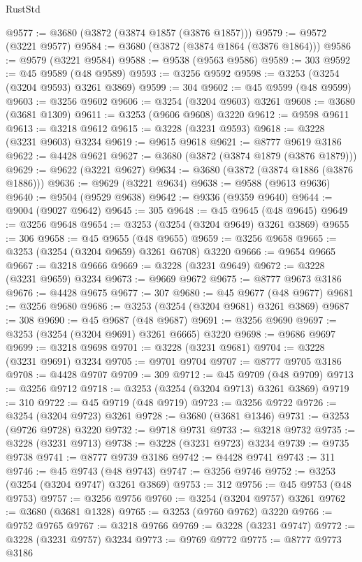 \begin{lexlean}{RustStd}
\begin{coremodule}
@9577 := @3680 (@3872 (@3874 @1857 (@3876 @1857)))
@9579 := @9572 (@3221 @9577)
@9584 := @3680 (@3872 (@3874 @1864 (@3876 @1864)))
@9586 := @9579 (@3221 @9584)
@9588 := @9538 (@9563 @9586)
@9589 := 303
@9592 := @45 @9589 (@48 @9589)
@9593 := @3256 @9592
@9598 := @3253 (@3254 (@3204 @9593) @3261 @3869)
@9599 := 304
@9602 := @45 @9599 (@48 @9599)
@9603 := @3256 @9602
@9606 := @3254 (@3204 @9603) @3261
@9608 := @3680 (@3681 @1309)
@9611 := @3253 (@9606 @9608) @3220
@9612 := @9598 @9611
@9613 := @3218 @9612
@9615 := @3228 (@3231 @9593)
@9618 := @3228 (@3231 @9603) @3234
@9619 := @9615 @9618
@9621 := @8777 @9619 @3186
@9622 := @4428 @9621
@9627 := @3680 (@3872 (@3874 @1879 (@3876 @1879)))
@9629 := @9622 (@3221 @9627)
@9634 := @3680 (@3872 (@3874 @1886 (@3876 @1886)))
@9636 := @9629 (@3221 @9634)
@9638 := @9588 (@9613 @9636)
@9640 := @9504 (@9529 @9638)
@9642 := @9336 (@9359 @9640)
@9644 := @9004 (@9027 @9642)
@9645 := 305
@9648 := @45 @9645 (@48 @9645)
@9649 := @3256 @9648
@9654 := @3253 (@3254 (@3204 @9649) @3261 @3869)
@9655 := 306
@9658 := @45 @9655 (@48 @9655)
@9659 := @3256 @9658
@9665 := @3253 (@3254 (@3204 @9659) @3261 @6708) @3220
@9666 := @9654 @9665
@9667 := @3218 @9666
@9669 := @3228 (@3231 @9649)
@9672 := @3228 (@3231 @9659) @3234
@9673 := @9669 @9672
@9675 := @8777 @9673 @3186
@9676 := @4428 @9675
@9677 := 307
@9680 := @45 @9677 (@48 @9677)
@9681 := @3256 @9680
@9686 := @3253 (@3254 (@3204 @9681) @3261 @3869)
@9687 := 308
@9690 := @45 @9687 (@48 @9687)
@9691 := @3256 @9690
@9697 := @3253 (@3254 (@3204 @9691) @3261 @6665) @3220
@9698 := @9686 @9697
@9699 := @3218 @9698
@9701 := @3228 (@3231 @9681)
@9704 := @3228 (@3231 @9691) @3234
@9705 := @9701 @9704
@9707 := @8777 @9705 @3186
@9708 := @4428 @9707
@9709 := 309
@9712 := @45 @9709 (@48 @9709)
@9713 := @3256 @9712
@9718 := @3253 (@3254 (@3204 @9713) @3261 @3869)
@9719 := 310
@9722 := @45 @9719 (@48 @9719)
@9723 := @3256 @9722
@9726 := @3254 (@3204 @9723) @3261
@9728 := @3680 (@3681 @1346)
@9731 := @3253 (@9726 @9728) @3220
@9732 := @9718 @9731
@9733 := @3218 @9732
@9735 := @3228 (@3231 @9713)
@9738 := @3228 (@3231 @9723) @3234
@9739 := @9735 @9738
@9741 := @8777 @9739 @3186
@9742 := @4428 @9741
@9743 := 311
@9746 := @45 @9743 (@48 @9743)
@9747 := @3256 @9746
@9752 := @3253 (@3254 (@3204 @9747) @3261 @3869)
@9753 := 312
@9756 := @45 @9753 (@48 @9753)
@9757 := @3256 @9756
@9760 := @3254 (@3204 @9757) @3261
@9762 := @3680 (@3681 @1328)
@9765 := @3253 (@9760 @9762) @3220
@9766 := @9752 @9765
@9767 := @3218 @9766
@9769 := @3228 (@3231 @9747)
@9772 := @3228 (@3231 @9757) @3234
@9773 := @9769 @9772
@9775 := @8777 @9773 @3186

\end{coremodule}
\end{lexlean}
